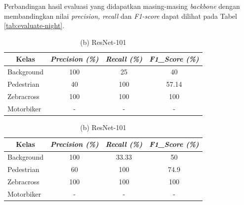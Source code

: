 Perbandingan hasil evaluasi yang didapatkan masing-masing \textit{backbone} dengan membandingkan nilai \textit{precision, recall} dan \textit{F1-score} dapat dilihat pada Tabel \ref{tab:evaluate-night}.

\begin{table}[H]
	\centering
	\caption{{Perbandingan Hasil Evaluasi pada Malam Hari}}
	\begin{minipage}[b]{\textwidth}
		\centering
		\caption*{(a) ResNet-50}
		\begin{tabular}{|l|c|c|c|}
			\hline
			\multicolumn{1}{|c|}{\textbf{Kelas}} & \textit{\textbf{Precision (\%)}} & \textit{\textbf{Recall (\%)}} & \textit{\textbf{F1\_Score (\%)}} \\ \hline
			Background                           & 100                              & 25                            & 40                               \\ \hline
			Pedestrian                           & 40                               & 100                           & 57.14                            \\ \hline
			Zebracross                           & 100                              & 100                           & 100                              \\ \hline
			Motorbiker                           & -                                & -                             & -                                \\ \hline
		\end{tabular}	
		
	\end{minipage}
	\vfill
	\begin{minipage}[b]{\textwidth}
		\centering
		\caption*{(b) ResNet-101}
		\begin{tabular}{|l|c|c|c|}
			\hline
			\multicolumn{1}{|c|}{\textbf{Kelas}} & \textit{\textbf{Precision (\%)}} & \textit{\textbf{Recall (\%)}} & \textit{\textbf{F1\_Score (\%)}} \\ \hline
			Background                           & 100                              & 33.33                         & 50                               \\ \hline
			Pedestrian                           & 60                               & 100                           & 74.9                             \\ \hline
			Zebracross                           & 100                              & 100                           & 100                              \\ \hline
			Motorbiker                           & -                                & -                             & -                                \\ \hline
		\end{tabular}
		

\end{minipage}
\end{table}
